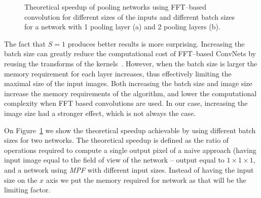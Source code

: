 \documentclass[conference]{./IEEEtran/IEEEtran}
\begin{document}
  \begin{figure}
    \centering
    \caption{Theoretical speedup of pooling networks using FFT--based
      convolution for different sizes of the inputs and different
      batch sizes for a network with 1 pooling layer (a) and 2 pooling
      layers (b).}
    \label{fig:fftbatch}
  \end{figure}

  The fact that $S=1$ produces better results is more surprising.
  Increasing the batch size can greatly reduce the computational cost
  of FFT--based ConvNets by reusing the transforms of the
  kernels~\cite{mathieu-iclr-14,vasilache2014fast}.  However, when the
  batch size is larger the memory requirement for each layer
  increases, thus effectively limiting the maximal size of the input
  images.  Both increasing the batch size and image size
  increase the memory requirements of the algorithm, and lower the
  computational complexity when FFT based convolutions are used.  In
  our case, increasing the image size had a stronger effect, which is
  not always the case.

  On Figure~\ref{fig:fftbatch} we show the theoretical speedup
  achievable by using different batch sizes for two networks.
  The theoretical speedup is defined as the ratio of operations
  required to compute a single output pixel of a naive approach
  (having input image equal to the field of view of the network --
  output equal to $1 \times 1 \times 1$, and a network using
  \emph{MPF} with different input sizes.  Instead of having the input
  size on the $x$ axis we put the memory required for network as that
  will be the limiting factor.
\end{document}
